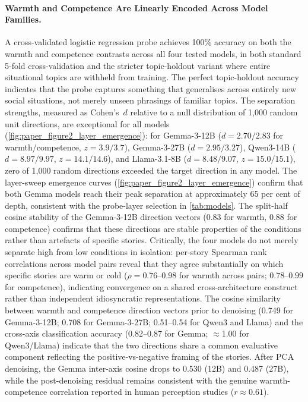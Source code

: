 \documentclass[twocolumn]{article}
\begin{document}
\paragraph{Warmth and Competence Are Linearly Encoded Across Model Families.}
A cross-validated logistic regression probe achieves 100\% accuracy on
both the warmth and competence contrasts across all four tested models,
in both standard 5-fold cross-validation and the stricter topic-holdout
variant where entire situational topics are withheld from training.
The perfect topic-holdout accuracy indicates that the probe captures
something that generalises across entirely new social situations, not
merely unseen phrasings of familiar topics.
The separation strengths, measured as Cohen's~$d$ relative to a null
distribution of 1,000 random unit directions, are exceptional for all
models (\autoref{fig:paper_figure2_layer_emergence}): for Gemma-3-12B
($d = 2.70/2.83$ for warmth/competence, $z = 3.9/3.7$),
Gemma-3-27B ($d = 2.95/3.27$),
Qwen3-14B ($d = 8.97/9.97$, $z = 14.1/14.6$),
and Llama-3.1-8B ($d = 8.48/9.07$, $z = 15.0/15.1$),
zero of 1,000 random directions exceeded the target direction in any model.
The layer-sweep emergence curves (\autoref{fig:paper_figure2_layer_emergence})
confirm that both Gemma models reach their peak separation at approximately
65 per cent of depth, consistent with the probe-layer selection in
\autoref{tab:models}.
The split-half cosine stability of the Gemma-3-12B direction vectors (0.83 for
warmth, 0.88 for competence) confirms that these directions are stable
properties of the conditions rather than artefacts of specific stories.
Critically, the four models do not merely separate high from low
conditions in isolation: per-story Spearman rank correlations across model
pairs reveal that they agree substantially on which specific stories are
warm or cold ($\rho = 0.76$--$0.98$ for warmth across pairs; $0.78$--$0.99$
for competence), indicating convergence on a shared cross-architecture
construct rather than independent idiosyncratic representations.
The cosine similarity between warmth and competence direction vectors
prior to denoising (0.749 for Gemma-3-12B; 0.708 for Gemma-3-27B;
0.51--0.54 for Qwen3 and Llama) and the cross-axis classification
accuracy (0.82--0.87 for Gemma; $\approx$1.00 for Qwen3/Llama) indicate
that the two directions share a common evaluative component reflecting
the positive-vs-negative framing of the stories.
After PCA denoising, the Gemma inter-axis cosine drops to 0.530 (12B)
and 0.487 (27B), while the post-denoising residual remains consistent
with the genuine warmth-competence correlation reported in human
perception studies ($r \approx 0.61$).
\end{document}
